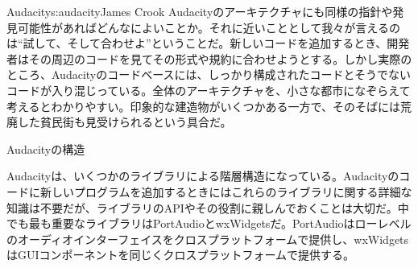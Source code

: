 \begin{aosachapter}{Audacity}{s:audacity}{James Crook}
Audacityのアーキテクチャにも同様の指針や発見可能性があればどんなによいことか。それに近いこととして我々が言えるのは``試して、そして合わせよ''ということだ。新しいコードを追加するとき、開発者はその周辺のコードを見てその形式や規約に合わせようとする。しかし実際のところ、Audacityのコードベースには、しっかり構成されたコードとそうでないコードが入り混じっている。全体のアーキテクチャを、小さな都市になぞらえて考えるとわかりやすい。印象的な建造物がいくつかある一方で、そのそばには荒廃した貧民街も見受けられるという具合だ。

\begin{aosasect1}{Audacityの構造}

Audacityは、いくつかのライブラリによる階層構造になっている。Audacityのコードに新しいプログラムを追加するときにはこれらのライブラリに関する詳細な知識は不要だが、ライブラリのAPIやその役割に親しんでおくことは大切だ。中でも最も重要なライブラリはPortAudioとwxWidgetsだ。PortAudioはローレベルのオーディオインターフェイスをクロスプラットフォームで提供し、wxWidgetsはGUIコンポーネントを同じくクロスプラットフォームで提供する。


\end{aosasect1}
\end{aosachapter}
